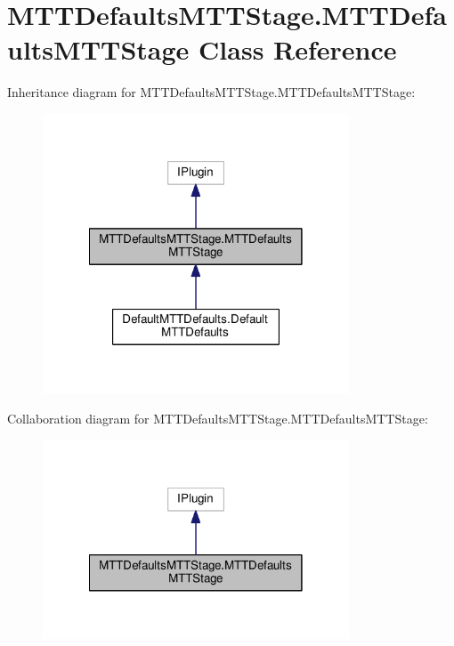 \hypertarget{class_m_t_t_defaults_m_t_t_stage_1_1_m_t_t_defaults_m_t_t_stage}{\section{M\-T\-T\-Defaults\-M\-T\-T\-Stage.\-M\-T\-T\-Defaults\-M\-T\-T\-Stage Class Reference}
\label{class_m_t_t_defaults_m_t_t_stage_1_1_m_t_t_defaults_m_t_t_stage}
}


Inheritance diagram for M\-T\-T\-Defaults\-M\-T\-T\-Stage.\-M\-T\-T\-Defaults\-M\-T\-T\-Stage\-:
\nopagebreak
\begin{figure}[H]
\begin{center}
\leavevmode
\includegraphics[width=258pt]{class_m_t_t_defaults_m_t_t_stage_1_1_m_t_t_defaults_m_t_t_stage__inherit__graph}
\end{center}
\end{figure}


Collaboration diagram for M\-T\-T\-Defaults\-M\-T\-T\-Stage.\-M\-T\-T\-Defaults\-M\-T\-T\-Stage\-:
\nopagebreak
\begin{figure}[H]
\begin{center}
\leavevmode
\includegraphics[width=258pt]{class_m_t_t_defaults_m_t_t_stage_1_1_m_t_t_defaults_m_t_t_stage__coll__graph}
\end{center}
\end{figure}
